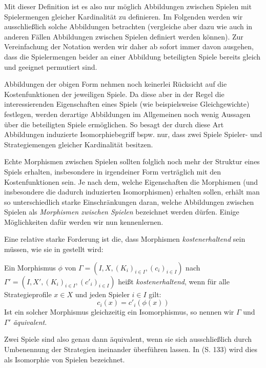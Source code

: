 \begin{beob}
	Mit dieser Definition ist es also nur möglich Abbildungen zwischen Spielen mit Spielermengen gleicher Kardinalität zu definieren. Im Folgenden werden wir ausschließlich solche Abbildungen betrachten (vergleiche aber  dazu wie auch in anderen Fällen Abbildungen zwischen Spielen definiert werden können). Zur Vereinfachung der Notation werden wir daher ab sofort immer davon ausgehen, dass die Spielermengen beider an einer Abbildung beteiligten Spiele bereits gleich und geeignet permutiert sind.
\end{beob}

Abbildungen der obigen Form nehmen noch keinerlei Rücksicht auf die Kostenfunktionen der jeweiligen Spiele. Da diese aber in der Regel die interessierenden Eigenschaften eines Spiels (wie beispielsweise Gleichgewichte) festlegen, werden derartige Abbildungen im Allgemeinen noch wenig Aussagen über die beteiligten Spiele ermöglichen. So besagt der durch diese Art Abbildungen induzierte Isomorphiebegriff bspw. nur, dass zwei Spiele Spieler- und Strategiemengen gleicher Kardinalität besitzen.

Echte Morphismen zwischen Spielen sollten folglich noch mehr der Struktur eines Spiels erhalten, insbesondere in irgendeiner Form \glqq verträglich\grqq{} mit den Kostenfunktionen sein. Je nach dem, welche Eigenschaften die Morphismen (und insbesondere die dadurch induzierten Isomorphismen) erhalten sollen, erhält man so unterschiedlich starke Einschränkungen daran, welche Abbildungen zwischen Spielen als \emph{Morphismen zwischen Spielen} bezeichnet werden dürfen. Einige Möglichkeiten dafür werden wir nun kennenlernen.

Eine relative starke Forderung ist die, dass Morphismen \emph{kostenerhaltend} sein müssen, wie sie in \cite{ReprOfFiniteGamesAsNCG} gestellt wird:

\begin{defn}
	Ein Morphismus $\phi$ von $\Gamma = (I, X, (K_i)_{i\in I}, (c_i)_{i\in I})$ nach $\Gamma' = (I, X', (K_i)_{i\in I}, (c'_i)_{i\in I})$ heißt \emph{kostenerhaltend}, wenn für alle Strategieprofile $x \in X$ und jeden Spieler $i \in I$ gilt:
		\[c_i(x) = c'_i(\phi(x)) \]
	Ist ein solcher Morphismus gleichzeitig ein Isomorphismus, so nennen wir $\Gamma$ und $\Gamma'$ \emph{äquivalent}.
\end{defn}

\begin{bem}
	Zwei Spiele sind also genau dann äquivalent, wenn sie sich ausschließlich durch Umbenennung der Strategien ineinander überführen lassen. In \cite{MonShap} (S. 133) wird dies als Isomorphie von Spielen bezeichnet.
\end{bem}

